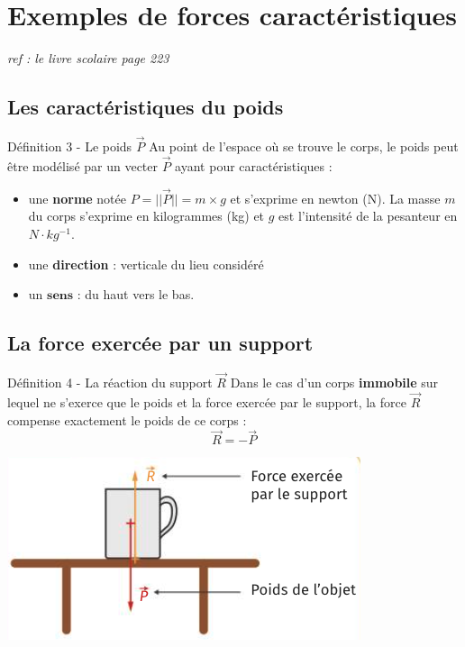 \documentclass[french, a4paper, 12pt, twocolumn, landscape]{article}
\begin{document}
\section{Exemples de forces caractéristiques}

\begin{center}
	\textit{ref : le livre scolaire page 223}
\end{center}

\subsection{Les caractéristiques du poids}

\begin{definition}{Définition 3 - Le poids $\overrightarrow{P}$}
	Au point de l'espace où se trouve le corps, le poids peut être modélisé par un vecter $\overrightarrow{P}$ ayant pour caractéristiques : 

	\begin{itemize}
		\item  une \textbf{norme} notée $P = ||\overrightarrow{P}|| = m\times g$ et s'exprime en newton (N). La masse $m$ du corps s'exprime en kilogrammes (kg) et $g$ est l'intensité de la pesanteur en $N\cdot kg^{-1}$.
		\item une \textbf{direction} : verticale du lieu considéré
		\item  un $\textbf{sens}$ : du haut vers le bas.
	\end{itemize}
\end{definition}
\subsection{La force exercée par un support}

\begin{definition}{Définition 4 - La réaction du support $\overrightarrow{R}$}
	\medskip
	Dans le cas d'un corps \textbf{immobile} sur lequel ne s'exerce que le poids et la force exercée par le support, la force $\overrightarrow{R}$ compense exactement le poids de ce corps : $$\overrightarrow{R} = - \overrightarrow{P}$$\medskip

	\begin{center}
	\includegraphics[width=.5\linewidth]{ForceExerceeSupprot.png}
	\end{center}
\end{definition}
\end{document}
